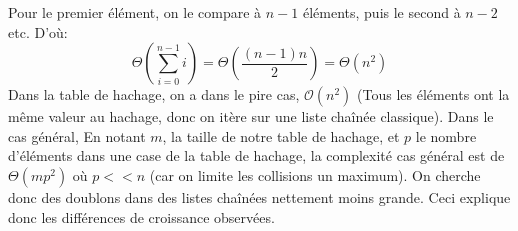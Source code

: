 \documentclass{article}
\begin{document}
    Pour le premier élément, on le compare à $n-1$ éléments, puis le second à $n-2$ etc.
    D'où:
    $$ \Theta\left(\sum^{n-1}_{i=0} i\right)  = \Theta\left(\frac{(n-1)n}{2}\right) = \Theta(n^2)$$  
    \newline
    Dans la table de hachage, on a dans le pire cas, $\mathcal O(n^2)$
    (Tous les éléments ont la même valeur au hachage, donc on itère sur une liste chaînée classique).
    \newline
    Dans le cas général,
    En notant $m$, la taille de notre table de hachage, et $p$ le nombre d'éléments dans une 
    case de la table de hachage,
    la complexité cas général est de $\Theta(mp^2)$ où $p << n$ (car on limite les collisions un maximum).
    \newline
    On cherche donc des doublons dans des listes chaînées nettement moins grande.
    Ceci explique donc les différences de croissance observées.

        
\end{document}
